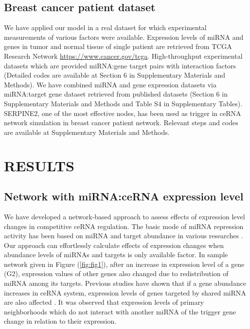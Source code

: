 \documentclass[a4,center,fleqn]{NAR}
\begin{document}
\subsection{Breast cancer patient dataset}

We have applied our model in a real dataset for which experimental
measurements of various factors were available. Expression levels of
miRNA and genes in tumor and normal tissue of single patient are
retrieved from TCGA Research Network \url{https://www.cancer.gov/tcga}.
High-throughput experimental datasets which are provided miRNA:gene
target pairs with interaction factors
\citep{helwak_mapping_2013, moore_mirnatarget_2015} (Detailed codes are
available at Section 6 in Supplementary Materials and Methods). We have
combined miRNA and gene expression datasets via miRNA:target gene
dataset retrieved from published datasets
\citep{helwak_mapping_2013, moore_mirnatarget_2015} (Section 6 in
Supplementary Materials and Methods and Table S4 in Supplementary
Tables). SERPINE2, one of the most effective nodes, has been used as
trigger in ceRNA network simulation in breast cancer patient network.
Relevant steps and codes are available at Supplementary Materials and
Methods.

\section{RESULTS}

\subsection{Network with miRNA:ceRNA expression level}

We have developed a network-based approach to assess effects of
expression level changes in competitive ceRNA regulation. The basic mode
of miRNA repression activity has been based on miRNA and target
abundance in various researches
\citep{arvey_target_2010, denzler_assessing_2014}. Our approach can
effortlessly calculate effects of expression changes when abundance
levels of miRNAs and targets is only available factor. In sample network
given in Figure (\ref{fig:fig1}), after an increase in expression level
of a gene (G2), expression values of other genes also changed due to
redistribution of miRNA among its targets. Previous studies have shown
that if a gene abundance increases in ceRNA system, expression levels of
genes targeted by shared miRNA are also affected
\citep{lai_understanding_2016, salmena_cerna_2011, tay_multilayered_2014}.
It was observed that expression levels of primary neighborhoods which do
not interact with another miRNA of the trigger gene change in relation
to their expression.
\end{document}
